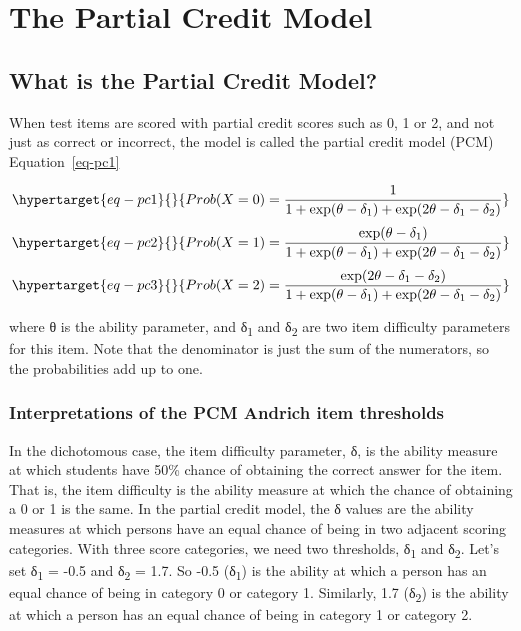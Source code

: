 \documentclass[
  letterpaper,
  DIV=11,
  numbers=noendperiod]{scrreprt}
\begin{document}
\part{The Partial Credit Model}

\hypertarget{what-is-the-partial-credit-model}{%
\chapter{What is the Partial Credit
Model?}\label{what-is-the-partial-credit-model}}

When test items are scored with partial credit scores such as 0, 1 or 2,
and not just as correct or incorrect, the model is called the partial
credit model (PCM) Equation~\ref{eq-pc1}

\begin{equation}\protect\hypertarget{eq-pc1}{}{
Prob(X=0) = \frac{1}{1+\exp(\theta - \delta_1) + \exp(2\theta - \delta_1 - \delta_2)}
}\label{eq-pc1}\end{equation}
\begin{equation}\protect\hypertarget{eq-pc2}{}{
Prob(X=1) = \frac{\exp(\theta - \delta_1)}{1+\exp(\theta - \delta_1) + \exp(2\theta - \delta_1 - \delta_2)}
}\label{eq-pc2}\end{equation}
\begin{equation}\protect\hypertarget{eq-pc3}{}{
Prob(X=2) = \frac{\exp(2\theta - \delta_1 - \delta_2)}{1+\exp(\theta - \delta_1) + \exp(2\theta - \delta_1 - \delta_2)}
}\label{eq-pc3}\end{equation}

where θ is the ability parameter, and δ\textsubscript{1} and
δ\textsubscript{2} are two item difficulty parameters for this item.
Note that the denominator is just the sum of the numerators, so the
probabilities add up to one.

\hypertarget{interpretations-of-the-pcm-andrich-item-thresholds}{%
\section{Interpretations of the PCM Andrich item
thresholds}\label{interpretations-of-the-pcm-andrich-item-thresholds}}

In the dichotomous case, the item difficulty parameter, δ, is the
ability measure at which students have 50\% chance of obtaining the
correct answer for the item. That is, the item difficulty is the ability
measure at which the chance of obtaining a 0 or 1 is the same. In the
partial credit model, the δ values are the ability measures at which
persons have an equal chance of being in two adjacent scoring
categories. With three score categories, we need two thresholds,
δ\textsubscript{1} and δ\textsubscript{2}. Let's set δ\textsubscript{1}
= -0.5 and δ\textsubscript{2} = 1.7. So -0.5 (δ\textsubscript{1}) is the
ability at which a person has an equal chance of being in category 0 or
category 1. Similarly, 1.7 (δ\textsubscript{2}) is the ability at which
a person has an equal chance of being in category 1 or category 2.
\end{document}
